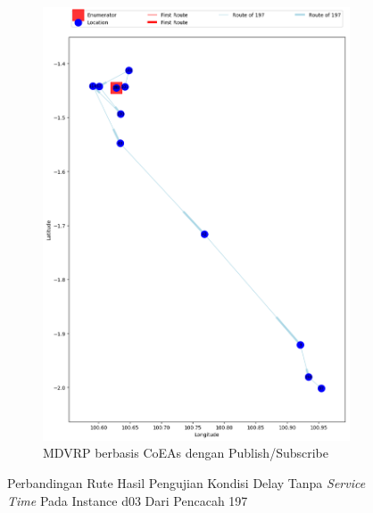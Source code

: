 \begin{figure}[H]\ContinuedFloat
	\centering
	\begin{subfigure}[t]{\textwidth}
		\centering
		\includegraphics[width=\textwidth]{Resources/Images/delayed_3/real_m15_n100_delayed_3_197_pubsub_coes}
		\caption{MDVRP berbasis CoEAs dengan Publish/Subscribe}
		\label{fig:real_m15_n100_delayed_3_197_pubsub_coes}
	\end{subfigure}
	\caption{Perbandingan Rute Hasil Pengujian Kondisi Delay Tanpa \textit{Service Time} Pada Instance d03 Dari Pencacah 197}
	\label{fig:real_m15_n100_delayed_3_197_contd}
\end{figure}



